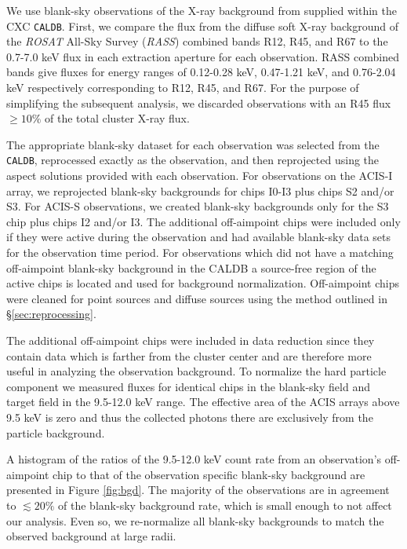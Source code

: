 \documentclass{emulateapj}
\begin{document}
We use blank-sky observations of the X-ray background from
\cite{2001ApJ...562L.153M} supplied within the CXC {\tt CALDB}. First, we
compare the flux from the diffuse soft X-ray background of the
{\textit{ROSAT}} All-Sky Survey ({\textit{RASS}}) combined
bands R12, R45, and R67 to the 0.7-7.0 keV flux in each extraction
aperture for each observation. RASS combined bands give fluxes for
energy ranges of 0.12-0.28 keV, 0.47-1.21 keV, and 0.76-2.04 keV
respectively corresponding to R12, R45, and R67. For the purpose of
simplifying the subsequent analysis, we discarded observations with an
R45 flux $\geq 10\%$ of the total cluster X-ray flux.

The appropriate blank-sky dataset for each observation was
selected from the {\tt CALDB}, reprocessed exactly as the
observation, and then reprojected using the aspect solutions provided
with each observation. For observations on the ACIS-I array, we
reprojected blank-sky backgrounds for chips I0-I3 plus chips S2 and/or
S3. For ACIS-S observations, we created blank-sky backgrounds only for
the S3 chip plus chips I2 and/or I3. The additional off-aimpoint
chips were included only if they were active during the observation
and had available blank-sky data sets for the observation time
period. For observations which did not have a matching off-aimpoint
blank-sky background in the CALDB a source-free region of the active
chips is located and used for background normalization. Off-aimpoint
chips were cleaned for point sources and diffuse sources using the
method outlined in \S\ref{sec:reprocessing}.

The additional off-aimpoint chips were included in data reduction
since they contain data which is farther from the cluster center and
are therefore more useful in analyzing the observation background. To
normalize the hard particle component we measured fluxes for identical
chips in the blank-sky field and target field in the 9.5-12.0 keV
range. The effective area of the ACIS arrays above 9.5 keV is zero and
thus the collected photons there are exclusively from the particle
background. 

A histogram of the ratios of the 9.5-12.0 keV count rate from an
observation's off-aimpoint chip to that of the observation specific
blank-sky background are presented in Figure \ref{fig:bgd}. The
majority of the observations are in agreement to $\lesssim 20\%$ of
the blank-sky background rate, which is small enough to not affect our
analysis. Even so, we re-normalize all blank-sky backgrounds to match
the observed background at large radii.
\end{document}
